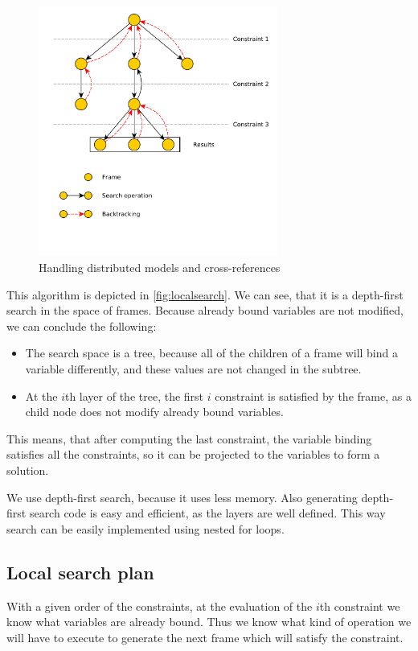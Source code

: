 	
\begin{figure}[h]
	\begin{center}
		\includegraphics[width=0.7\textwidth]{figures/localsearch.pdf}
		\caption{Handling distributed models and cross-references}
		\label{fig:localsearch}
	\end{center}
\end{figure}
	
This algorithm is depicted in \autoref{fig:localsearch}. 
We can see, that it is a depth-first search in the space of frames. 
Because already bound variables are not modified, we can conclude the following:
\begin{itemize}
	\item 
	The search space is a tree, because all of the children of a frame will bind a variable differently, and these values are not changed in the subtree.
	\item
	At the $i$th layer of the tree, the first $i$ constraint is satisfied by the frame, as a child node does not modify already bound variables.
		
\end{itemize}

This means, that after computing the last constraint, the variable binding satisfies all the constraints, so it can be projected to the variables to form a solution.

We use depth-first search, because it uses less memory. Also generating depth-first search code is easy and efficient, as the layers are well defined. This way search can be easily implemented using nested for loops.

\subsection{Local search plan}
With a given order of the constraints, at the evaluation of the $i$th constraint we know what variables are already bound. Thus we know what kind of operation we will have to execute to generate the next frame which will satisfy the constraint.

